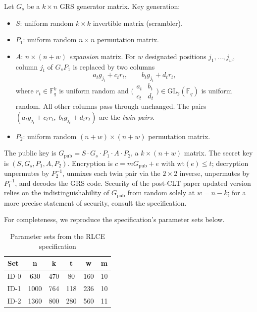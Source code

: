 Let $G_s$ be a $k \times n$ GRS generator
matrix. Key generation:
\begin{itemize}
    \item $S$: uniform random $k \times k$ invertible matrix (scrambler).
    \item $P_1$: uniform random $n \times n$ permutation matrix.
    \item $A$: $n \times (n+w)$ \emph{expansion} matrix. For $w$ designated
          positions $j_1,\dots,j_w$, column $j_t$ of $G_s P_1$ is replaced by
          two columns
          \[
              a_t g_{j_t} + c_t r_t, \qquad b_t g_{j_t} + d_t r_t,
          \]
          where $r_t \in \mathbb{F}_q^k$ is uniform random and
          $\bigl(\begin{smallmatrix}a_t&b_t\\c_t&d_t\end{smallmatrix}\bigr) \in
              \mathrm{GL}_2(\mathbb{F}_q)$ is uniform random. All other columns
          pass through
          unchanged. The pairs $(a_t g_{j_t} + c_t r_t,\; b_t g_{j_t} + d_t
              r_t)$ are the
          \emph{twin pairs}.
    \item $P_2$: uniform random $(n+w) \times (n+w)$ permutation matrix.
\end{itemize}
The public key is $G_{\mathrm{pub}} = S \cdot G_s \cdot P_1 \cdot A \cdot P_2$,
a $k \times (n+w)$ matrix. The secret key is $(S, G_s, P_1, A, P_2)$.
Encryption is $c = m G_{\mathrm{pub}} + e$ with $\mathrm{wt}(e) \leq t$;
decryption unpermutes by $P_2^{-1}$, unmixes each twin pair via the $2 \times
    2$ inverse, unpermutes by $P_1^{-1}$, and decodes the GRS code. Security of
the post-CLT paper updated version
relies
on the indistinguishability of $G_{\mathrm{pub}}$ from random solely at $w =
    n-k$; for a more precise statement of
security, consult the specification.


For completeness, we reproduce the specification's parameter sets below.

\begin{table}[htbp]
\centering
\footnotesize
\begin{tabular}{lccccc}
\toprule
Set &  n & k & t & w & m \\
\midrule
ID-0 & 630 & 470 & 80 & 160 & 10 \\
ID-1 & 1000 & 764 & 118 & 236 & 10 \\
ID-2 & 1360 & 800 & 280 & 560 & 11 \\
\bottomrule
\end{tabular}
\caption{Parameter sets from the RLCE specification}
\label{tab:spec-params}
\end{table}
